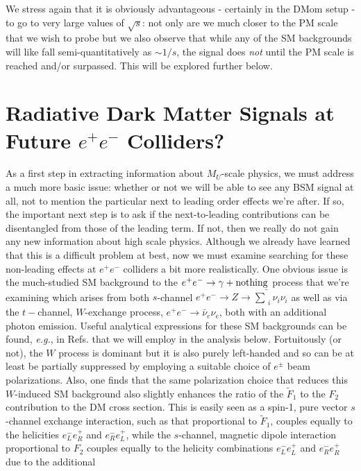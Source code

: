 \documentclass[14pt]{article}
\def\eg{{\it e.g.}}
\def\to{\rightarrow}
\begin{document}
{We stress again that it is obviously advantageous - certainly in the DMom setup - to go to very large values of $\sqrt s$: not only are we much closer to the PM scale that we wish to probe 
but we also observe that while any of the SM backgrounds will like fall semi-quantitatively as $\sim 1/s$, the signal does {\it not} until the PM scale is reached and/or surpassed.  This will be explored 
further below. 


\section{Radiative Dark Matter Signals at Future $e^+e^-$ Colliders?}


As a first step in extracting information about $M_U$-scale physics, we must address a much more basic issue: whether or not we will be able to see any BSM signal at all, not to mention the 
particular next to leading order effects we're after.  If so, the important next step is to ask if the next-to-leading contributions can be disentangled from those of the leading term. If not, then we really 
do not gain any new information about high scale physics. 
Although we already have learned that this is a difficult problem at best, now we must examine searching for these non-leading effects at $e^+e^-$ colliders a bit more realistically. One obvious issue is 
the much-studied SM background to the $e^+e^-\to \gamma +{\rm nothing}$ process that we're examining which arises from both $s$-channel $e^+e^-\to Z\to \bar \sum_i \nu_i \nu_i$ as well as via the 
$t-$channel, $W$-exchange process,  $e^+e^-\to \bar \nu_e \nu_e$, both with an additional photon emission. Useful analytical expressions for these SM backgrounds can be found, \eg, in 
Refs.\cite{Hirsch:2002uv,Barranco:2007ej,Berezhiani:2001rs,Escrihuela:2019mot} that we will employ in the analysis below. Fortuitously (or not), the $W$ process is dominant but it is also purely 
left-handed and so can be at least be partially suppressed by employing a suitable choice of $e^\pm$ beam polarizations. 
Also, one finds that the same polarization choice that reduces this $W$-induced SM background also slightly enhances the ratio of the $\tilde F_1$ to the $F_2$ contribution to the DM 
cross section. This is easily seen as a spin-1, pure vector $s$-channel exchange interaction, such as that proportional to $\tilde F_1$, couples equally to the helicities $e_L^-e_R^+$ and 
$e_R^-e_L^+$, while the $s$-channel, magnetic dipole interaction proportional to $F_2$ couples equally to the helicity combinations $e_L^-e_L^+$ and $e_R^-e_R^+$ due to the additional 
}
\end{document}
